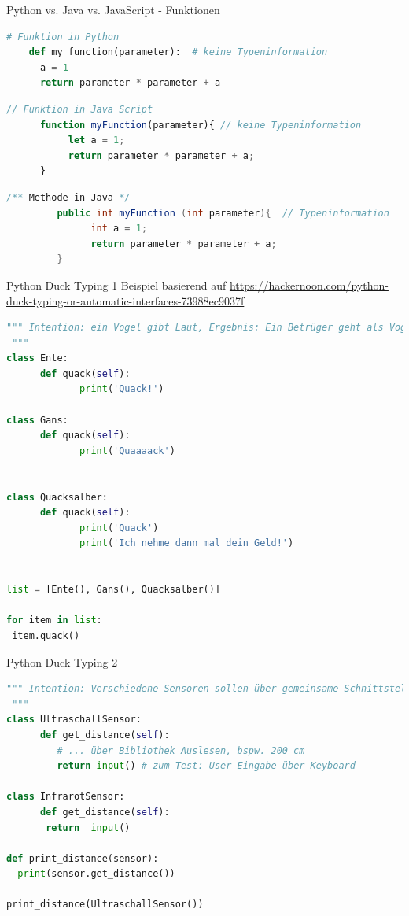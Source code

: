 \begin{frame}[fragile]{Python vs. Java vs. JavaScript - Funktionen}
\begin{lstlisting}[language=Python]
	# Funktion in Python
 	def my_function(parameter):  # keine Typeninformation
	  a = 1
	  return parameter * parameter + a
	\end{lstlisting}
\begin{lstlisting}[language=JavaScript]
       // Funktion in Java Script
 	  function myFunction(parameter){ // keine Typeninformation
	       let a = 1;
	       return parameter * parameter + a;
	  }
\end{lstlisting}
\begin{lstlisting}[language=Java]
       /** Methode in Java */
      	 public int myFunction (int parameter){  // Typeninformation
	           int a = 1;
	           return parameter * parameter + a;
         }
\end{lstlisting}
\end{frame}


\begin{frame}[fragile]{Python Duck Typing 1}
Beispiel basierend auf \url{https://hackernoon.com/python-duck-typing-or-automatic-interfaces-73988ec9037f}
\begin{lstlisting}[language=Python]
 """ Intention: ein Vogel gibt Laut, Ergebnis: Ein Betrüger geht als Vogel durch, denn er kann ja quack machen und nimmt das Geld mit.
 """
class Ente:
	  def quack(self):
             print('Quack!')
             
class Gans:
	  def quack(self):
             print('Quaaaack')
             

class Quacksalber:
      def quack(self):
             print('Quack')
             print('Ich nehme dann mal dein Geld!')


list = [Ente(), Gans(), Quacksalber()]
        
for item in list:
 item.quack()  

	\end{lstlisting}
\end{frame}

\begin{frame}[fragile]{Python Duck Typing 2}
\begin{lstlisting}[language=Python]
 """ Intention: Verschiedene Sensoren sollen über gemeinsame Schnittstelle die Distanz zurückliefern
 """
class UltraschallSensor:
	  def get_distance(self):
	     # ... über Bibliothek Auslesen, bspw. 200 cm
	     return input() # zum Test: User Eingabe über Keyboard
             
class InfrarotSensor:
	  def get_distance(self):
	   return  input()

def print_distance(sensor):
  print(sensor.get_distance())

print_distance(UltraschallSensor())

\end{lstlisting}
\end{frame}


